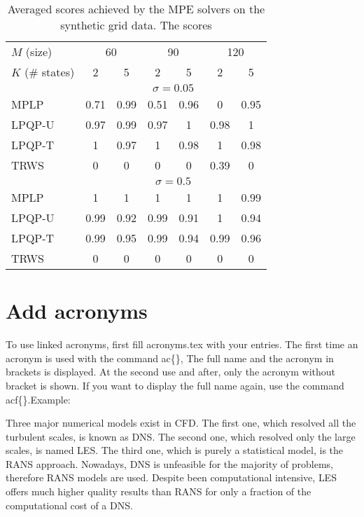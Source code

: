 \begin{table}[htb]
	\centering
	\begin{tabular}{l cc cc cc}
		\hline
		$M$ (size)  &  \multicolumn{2}{c}{60} &  \multicolumn{2}{c}{90} &  \multicolumn{2}{c}{120} \\
		$K$ (\# states)  &  2  &  5  &  2  & 5  &  2  & 5 \\
		\hline\hline
		& \multicolumn{6}{c}{$\sigma=0.05$} \\
		\cline{2-7}
		MPLP   &    0.71  &    0.99   &   0.51  &    0.96   &   0  &    0.95 \\
		LPQP-U   &    0.97  &    0.99   &   0.97  &    1   & 0.98  &    1 \\
		LPQP-T   &    1  &    0.97   &   1  &    0.98   & 1  &    0.98 \\
		TRWS   &    0  &    0   &   0  &    0   &   0.39  &    0\\
		\cline{2-7}
		& \multicolumn{6}{c}{$\sigma=0.5$}  \\
		\cline{2-7}
		MPLP   &    1  &    1   &   1  &    1   & 1  &    0.99\\
		LPQP-U   &    0.99  &    0.92   &   0.99  &    0.91   &   1  &    0.94\\
		LPQP-T   &    0.99  &    0.95   &   0.99  &    0.94   &   0.99  &    0.96\\
		TRWS   &    0  &    0   &   0  &    0   &   0  &    0\\
		\hline
	\end{tabular}	
	\caption[]{Averaged scores achieved by the MPE solvers on the synthetic grid data. 
		The scores}
	\label{tab:lpqp:grid}
\end{table}

\section{Add acronyms}
\label{sec:Add acronyms}
To use linked acronyms, first fill acronyms.tex with your entries. The first time an acronym is used with the command ac\{\}, The full name and the acronym in brackets is displayed. At the second use and after, only the acronym without bracket is shown. If you want to display the full name again, use the command acf\{\}.Example:
 
Three major numerical models exist in \ac{CFD}. The first one, which resolved all the turbulent scales, is known as \ac{DNS}. The second one, which resolved only the large scales, is named \ac{LES}. The third one, which is purely a statistical model, is the \ac{RANS} approach. Nowadays, \ac{DNS} is unfeasible for the majority of problems, therefore \ac{RANS} models are used. Despite been computational intensive, \ac{LES} offers much higher quality results than \acf{RANS} for only a fraction of the computational cost of a \ac{DNS}.

